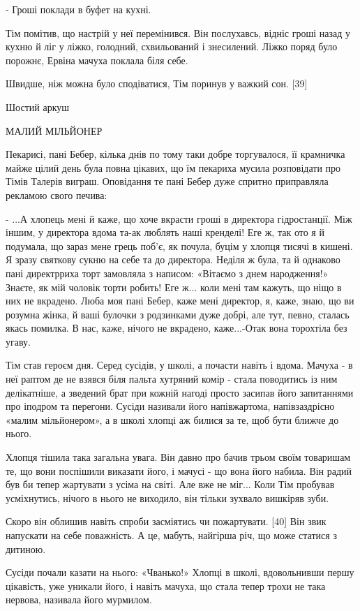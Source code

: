 - Гроші поклади в буфет на кухні.

Тім помітив, що настрій у неї перемінився. Він послухавсь, відніс гроші назад у кухню й ліг у ліжко, голодний, схвильований і знесилений. Ліжко поряд було порожнє, Ервіна мачуха поклала біля себе.

Швидше, ніж можна було сподіватися, Тім поринув у важкий сон. [39]

Шостий аркуш

МАЛИЙ МІЛЬЙОНЕР

Пекарисі, пані Бебер, кілька днів по тому таки добре торгувалося, її крамничка майже цілий день була повна цікавих, що їм пекариха мусила розповідати про Тімів Талерів виграш. Оповідання те пані Бебер дуже спритно приправляла рекламою свого печива:

- ...А хлопець мені й каже, що хоче вкрасти гроші в директора гідростанції. Між іншим, у директора вдома та-ак люблять наші кренделі! Еге ж, так ото я й подумала, що зараз мене грець поб'є, як почула, буцім у хлопця тисячі в кишені. Я зразу святкову сукню на себе та до директора. Неділя ж була, та й однаково пані директрриха торт замовляла з написом: «Вітаємо з днем народження!» Знаєте, як мій чоловік торти робить! Еге ж... коли мені там кажуть, що ніщо в них не вкрадено. Люба моя пані Бебер, каже мені директор, я, каже, знаю, що ви розумна жінка, й ваші булочки з родзинками дуже добрі, але тут, певно, сталась якась помилка. В нас, каже, нічого не вкрадено, каже...-Отак вона торохтіла без угаву.

Тім став героєм дня. Серед сусідів, у школі, а почасти навіть і вдома. Мачуха - в неї раптом де не взявся біля пальта хутряний комір - стала поводитись із ним делікатніше, а зведений брат при кожній нагоді просто засипав його запитаннями про іподром та перегони. Сусіди називали його напівжартома, напівзаздрісно «малим мільйонером», а в школі хлопці аж билися за те, щоб бути ближче до нього.

Хлопця тішила така загальна увага. Він давно про бачив трьом своїм товаришам те, що вони поспішили виказати його, і мачусі - що вона його набила. Він радий був би тепер жартувати з усіма на світі. Але вже не міг... Коли Тім пробував усміхнутись, нічого в нього не виходило, він тільки зухвало вишкіряв зуби.

Скоро він облишив навіть спроби засміятись чи пожартувати. [40] Він звик напускати на себе поважність. А це, мабуть, найгірша річ, що може статися з дитиною.

Сусіди почали казати на нього: «Чванько!» Хлопці в школі, вдовольнивши першу цікавість, уже уникали його, і навіть мачуха, що стала тепер трохи не така нервова, називала його мурмилом.

